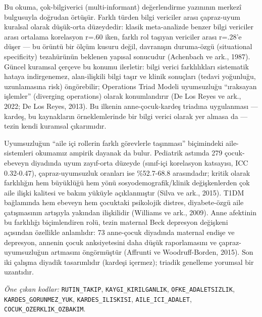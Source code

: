 \documentclass[
  turkish,
  a4paper,
  DIV=11,
  numbers=noendperiod]{scrreprt}
\begin{document}
Bu okuma, çok-bilgiverici (multi-informant) değerlendirme yazınının
merkezî bulgusuyla doğrudan örtüşür. Farklı türden bilgi vericiler arası
çapraz-uyum kuralsal olarak düşük-orta düzeydedir: klasik meta-analizde
benzer bilgi vericiler arası ortalama korelasyon r=.60 iken, farklı rol
taşıyan vericiler arası r=.28'e düşer --- bu örüntü bir ölçüm kusuru
değil, davranışın duruma-özgü (situational specificity) tezahürünün
beklenen yapısal sonucudur (Achenbach ve ark., 1987). Güncel kuramsal
çerçeve bu konumu ilerletir: bilgi verici farklılıkları sistematik
hataya indirgenemez, alan-ilişkili bilgi taşır ve klinik sonuçları
(tedavi yoğunluğu, uzunlamasına risk) öngörebilir; Operations Triad
Modeli uyumsuzluğu ``ıraksayan işlemler'' (diverging operations) olarak
konumlandırır (De Los Reyes ve ark., 2022; De Los Reyes, 2013). Bu
ilkenin anne-çocuk-kardeş triadına uygulanması --- kardeş, bu
kaynakların örneklemlerinde bir bilgi verici olarak yer almasa da ---
tezin kendi kuramsal çıkarımıdır.

Uyumsuzluğun ``aile içi rollerin farklı görevlerle taşınması''
biçimindeki aile-sistemleri okumamız ampirik dayanak da bulur. Pediatrik
astımda 279 çocuk-ebeveyn diyadında uyum zayıf-orta düzeyde (sınıf-içi
korelasyon katsayısı, ICC 0.32-0.47), çapraz-uyumsuzluk oranları ise
\%52.7-68.8 arasındadır; kritik olarak farklılığın hem büyüklüğü hem
yönü sosyodemografik/klinik değişkenlerden çok aile ilişki kalitesi ve
bakım yüküyle açıklanmıştır (Silva ve ark., 2015). T1DM bağlamında hem
ebeveyn hem çocuktaki psikolojik distres, diyabete-özgü aile
çatışmasının artışıyla yakından ilişkilidir (Williams ve ark., 2009).
Anne afektinin bu farklılığı biçimlendiren rolü, tezin maternal Beck
depresyon değişkeni açısından özellikle anlamlıdır: 73 anne-çocuk
diyadında maternal endişe ve depresyon, annenin çocuk anksiyetesini daha
düşük raporlamasını ve çapraz-uyumsuzluğun artmasını öngörmüştür
(Affrunti ve Woodruff-Borden, 2015). Son iki çalışma diyadik
tasarımlıdır (kardeşi içermez); triadik genelleme yorumsal bir
uzantıdır.

\emph{Öne çıkan kodlar:} \texttt{RUTIN\_TAKIP},
\texttt{KAYGI\_KIRILGANLIK}, \texttt{OFKE\_ADALETSIZLIK},
\texttt{KARDES\_GORUNMEZ\_YUK}, \texttt{KARDES\_ILISKISI},
\texttt{AILE\_ICI\_ADALET}, \texttt{COCUK\_OZERKLIK\_OZBAKIM}.
\end{document}
